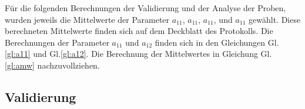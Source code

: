 	Für die folgenden Berechnungen der Validierung und der Analyse der Proben,  wurden jeweils die Mittelwerte der Parameter $a_{11}$, $a_{11}$, $a_{11}$,  und $a_{11}$ gewählt. Diese berechneten Mittelwerte finden sich auf dem Deckblatt des Protokolls. Die Berechnungen der Parameter $a_{11}$ und $a_{12}$ finden sich in den Gleichungen Gl.\eqref{gl:a11} und Gl.\eqref{gl:a12}. Die Berechnung der Mittelwertes in Gleichung Gl.\eqref{gl:amw} nachzuvollziehen.
	
	\subsection*{Validierung}